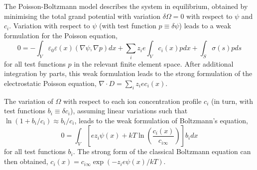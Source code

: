 The Poisson-Boltzmann model describes the system in equilibrium,
obtained by minimising the total grand potential with variation
$\delta\Omega=0$ with respect to $\psi$ and $c_i$. Variation with
respect to $\psi$ (with test function $p \equiv \delta \psi$) leads to a weak formulation
for the Poisson equation,
\begin{equation}
    0 = -\int_{V} \varepsilon_{0}\varepsilon(x) (\nabla\psi,\nabla p) dx + \sum_{i}z_i e \int_{V} c_{i}(x) p dx + \int_{S} \sigma(s) p ds  
    \label{weak_Poisson}
\end{equation}
for all test functions $p$ in the relevant finite element space.  After additional
integration by parts, this weak formulation leads to the strong
formulation of the electrostatic Poisson equation,
$\nabla\cdot D = \sum_i z_i e c_{i}(x)$.

The variation of $\Omega$ with
respect to each ion concentration profile $c_i$ (in turn, with test
functions $b_i\equiv \delta c_i$), assuming linear variations such that
$\ln(1+b_i/c_i)\approx b_i/c_i$, leads to the weak formulation of Boltzmann's
equation,
\begin{equation}
    0 = \int_{V} \left[ e z_i \psi(x)
    + kT \ln\left(\frac{c_i(x)}{c_{i\infty}}\right)
  \right] b_i dx
    \label{weak_Boltzmann}
\end{equation}
for all test functions $b_i$. The strong form of the classical Boltzmann equation can then obtained, $c_i(x)=c_{i\infty}\exp(-z_i e \psi(x)/kT)$. 

